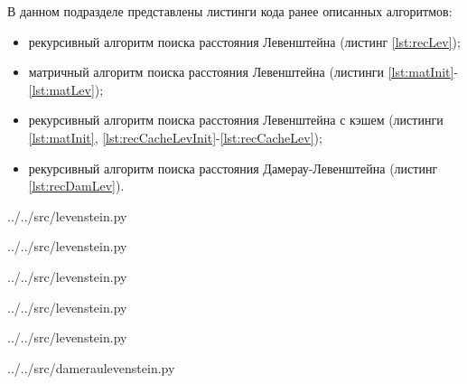 В данном подразделе представлены листинги кода ранее описанных алгоритмов:
\begin{itemize}[left=\parindent]
    \item рекурсивный алгоритм поиска расстояния Левенштейна (листинг
          \ref{lst:recLev});
    \item матричный алгоритм поиска расстояния Левенштейна (листинги
          \ref{lst:matInit}-\ref{lst:matLev});
    \item рекурсивный алгоритм поиска расстояния Левенштейна с кэшем (листинги
          \ref{lst:matInit}, \ref{lst:recCacheLevInit}-\ref{lst:recCacheLev});
    \item рекурсивный алгоритм поиска расстояния Дамерау-Левенштейна (листинг
          \ref{lst:recDamLev}).
\end{itemize}

\begin{lstinputlisting}[
	caption={Реализация рекурсивного алгоритма поиска расстояния Левенштейна},
	label={lst:recLev},
	linerange={20-35}
]{../../src/levenstein.py}
\end{lstinputlisting}

\begin{lstinputlisting}[
	caption={Реализация инициализации матрицы},
	label={lst:matInit},
	linerange={3-7}
]{../../src/levenstein.py}
\end{lstinputlisting}

\begin{lstinputlisting}[
	caption={Реализация матричного алгоритма поиска расстояния Левенштейна},
	label={lst:matLev},
	linerange={38-52}
]{../../src/levenstein.py}
\end{lstinputlisting}

\begin{lstinputlisting}[
    caption={Реализация инициализации данных для рекурсивного алгоритма поиска
             расстояния Левенштейна с кэшем},
	label={lst:recCacheLevInit},
	linerange={77-82}
]{../../src/levenstein.py}
\end{lstinputlisting}

\begin{lstinputlisting}[
	caption={Реализация рекурсивного алгоритма поиска расстояния Левенштейна с кэшем},
	label={lst:recCacheLev},
	linerange={55-74}
]{../../src/levenstein.py}
\end{lstinputlisting}

\begin{lstinputlisting}[
	caption={Реализация рекурсивного алгоритма поиска расстояния Дамерау-Левенштейна},
	label={lst:recDamLev},
	linerange={1-24}
]{../../src/dameraulevenstein.py}
\end{lstinputlisting}

